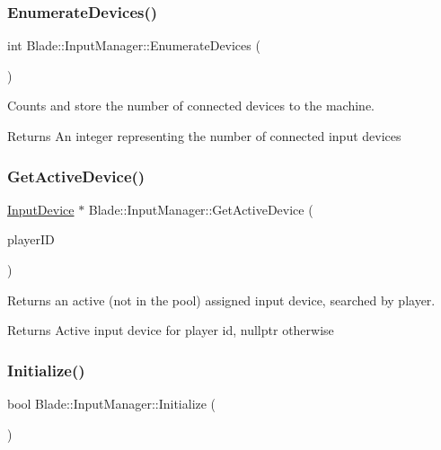\subsubsection{\texorpdfstring{Enumerate\+Devices()}{EnumerateDevices()}}
{\footnotesize\ttfamily int Blade\+::\+Input\+Manager\+::\+Enumerate\+Devices (\begin{DoxyParamCaption}{ }\end{DoxyParamCaption})\hspace{0.3cm}{\ttfamily [noexcept]}}



Counts and store the number of connected devices to the machine. 

\begin{DoxyReturn}{Returns}
An integer representing the number of connected input devices 
\end{DoxyReturn}
\mbox{\label{class_blade_1_1_input_manager_a8b5863fec63f8e322476cd1a4a4292dc}} 
\subsubsection{\texorpdfstring{Get\+Active\+Device()}{GetActiveDevice()}}
{\footnotesize\ttfamily \hyperlink{class_blade_1_1_input_device}{Input\+Device} $\ast$ Blade\+::\+Input\+Manager\+::\+Get\+Active\+Device (\begin{DoxyParamCaption}\item[{Joypad\+Number}]{player\+ID }\end{DoxyParamCaption})}



Returns an active (not in the pool) assigned input device, searched by player. 

\begin{DoxyReturn}{Returns}
Active input device for player id, nullptr otherwise 
\end{DoxyReturn}
\mbox{\label{class_blade_1_1_input_manager_a979db0aea29e22ed95c2642649922a41}} 
\subsubsection{\texorpdfstring{Initialize()}{Initialize()}}
{\footnotesize\ttfamily bool Blade\+::\+Input\+Manager\+::\+Initialize (\begin{DoxyParamCaption}{ }\end{DoxyParamCaption})\hspace{0.3cm}{\ttfamily [noexcept]}}



